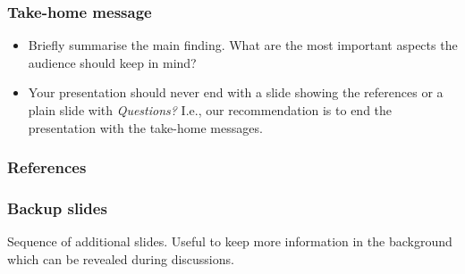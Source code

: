 \documentclass[t,english]{beamer}
\begin{document}

\begin{frame}
  \frametitle{Take-home message}
  
  \begin{itemize}
      \item Briefly summarise the main finding. What are the most important aspects the audience should keep in mind?
      \item Your presentation should never end with a slide showing the references or a plain slide with \emph{Questions?} I.e., our recommendation is to end the presentation with the take-home messages.
  \end{itemize}
\end{frame}

\appendix


\begin{frame}
  \frametitle{References}
  \printbibliography[heading=none]
\end{frame}


\begin{frame}
  \frametitle{Backup slides}

  Sequence of additional slides. Useful to keep more information in the background which can be revealed during discussions.

\end{frame}
\end{document}
